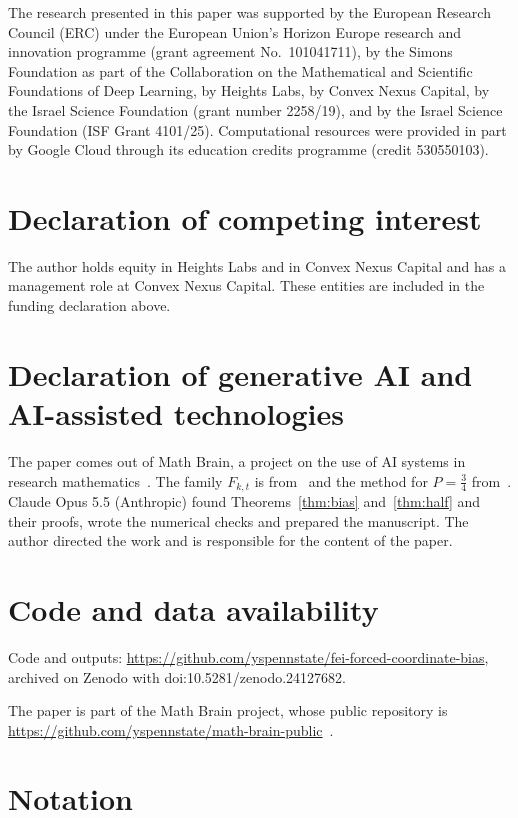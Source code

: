 \documentclass[11pt]{amsart}
\theoremstyle{remark}
\begin{document}
The research presented in this paper was supported by the European Research Council (ERC) under the European Union's
Horizon Europe research and innovation programme (grant agreement No.~101041711), by the Simons Foundation as part of
the Collaboration on the Mathematical and Scientific Foundations of Deep Learning, by Heights Labs, by Convex Nexus
Capital, by the Israel Science Foundation (grant number 2258/19), and by the Israel Science Foundation (ISF Grant
4101/25). Computational resources were provided in part by Google Cloud through its education credits programme (credit
530550103).

\section*{Declaration of competing interest}
The author holds equity in Heights Labs and in Convex Nexus Capital and has a management role at Convex Nexus Capital.
These entities are included in the funding declaration above.

\section*{Declaration of generative AI and AI-assisted technologies}
The paper comes out of Math Brain, a project on the use of AI systems in research mathematics~\cite{BrainFramework,MathBrainRepo}. The family $F_{k,t}$
is from~\cite{Shm8} and the method for $P=\frac34$ from~\cite{Shm9}. Claude Opus 5.5 (Anthropic) found
Theorems~\ref{thm:bias} and~\ref{thm:half} and their proofs, wrote the numerical checks and prepared the manuscript.
The author directed the work and is responsible for the content of the paper.

\section*{Code and data availability}
Code and outputs: \url{https://github.com/yspennstate/fei-forced-coordinate-bias}, archived on Zenodo with doi:10.5281/zenodo.24127682.

The paper is part of the Math Brain project, whose public repository is
\url{https://github.com/yspennstate/math-brain-public}~\cite{MathBrainRepo}.

\appendix
\section{Notation}\label{app:notation}
\end{document}
